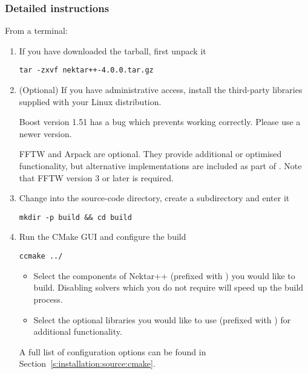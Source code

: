 \subsubsection{Detailed instructions}
From a terminal:
\begin{enumerate}
    \item If you have downloaded the tarball, first unpack it
    \begin{lstlisting}[style=BashInputStyle]
    tar -zxvf nektar++-4.0.0.tar.gz
    \end{lstlisting}
    
    \item (Optional) If you have administrative access, install the third-party
    libraries supplied with your Linux distribution.

    \begin{warningbox}
    Boost version 1.51 has a bug which prevents \nekpp working correctly.
    Please use a newer version.
    \end{warningbox}
    
    \begin{notebox}
    FFTW and Arpack are optional. They provide additional or optimised
    functionality, but alternative implementations are included as part of
    \nekpp. Note that FFTW version 3 or later is required.
    \end{notebox}

    \item Change into the source-code directory, create a 
    subdirectory and enter it 
    \begin{lstlisting}[style=BashInputStyle]
    mkdir -p build && cd build
    \end{lstlisting}
    
    \item Run the CMake GUI and configure the build
    \begin{lstlisting}[style=BashInputStyle]
    ccmake ../
    \end{lstlisting}
    \begin{itemize}
        \item Select the components of Nektar++ (prefixed with
        ) you would like to build. Disabling solvers
        which you do not require will speed up the build process.
        \item Select the optional libraries you would like to use (prefixed with
        ) for additional functionality.
    \end{itemize}
    A full list of configuration options can be found in
    Section~\ref{s:installation:source:cmake}.
    

\end{enumerate}

